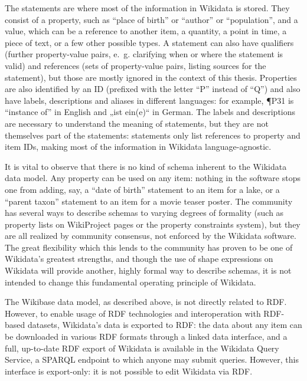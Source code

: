 The statements are where most of the information in Wikidata is stored.
They consist of a property, such as “place of birth” or “author” or “population”,
and a value, which can be a reference to another item, a quantity, a point in time, a piece of text,
or a few other possible types.
A statement can also have qualifiers
(further property-value pairs, e.~g. clarifying when or where the statement is valid)
and references (sets of property-value pairs, listing sources for the statement),
but those are mostly ignored in the context of this thesis.
Properties are also identified by an ID
(prefixed with the letter “P” instead of “Q”)
and also have labels, descriptions and aliases in different languages:
for example, \P{P31} is “instance of” in English and „\foreignlanguage{ngerman}{ist ein(e)}“ in German.
The labels and descriptions are necessary to understand the meaning of statements,
but they are not themselves part of the statements:
statements only list references to property and item IDs,
making most of the information in Wikidata language-agnostic.

It is vital to observe that there is no kind of schema inherent to the Wikidata data model.
Any property can be used on any item:
nothing in the software stops one from adding, say,
a “date of birth” statement to an item for a lake,
or a “parent taxon” statement to an item for a movie teaser poster.
The community has several ways to describe schemas to varying degrees of formality
(such as property lists on WikiProject pages or the property constraints system),
but they are all realized by community consensus,
not enforced by the Wikidata software.
The great flexibility which this lends to the community has proven to be one of Wikidata’s greatest strengths, %
and though the use of shape expressions %
on Wikidata will provide another,
highly formal way to describe schemas,
it is not intended to change this fundamental operating principle of Wikidata. %

The Wikibase data model, as described above,
is not directly related to RDF. %
However, to enable usage of RDF technologies and interoperation with RDF-based datasets,
Wikidata’s data is exported to RDF:
the data about any item can be downloaded in various RDF formats through a linked data interface, %
and a full, up-to-date RDF export of Wikidata is available in the Wikidata Query Service,
a SPARQL endpoint to which anyone may submit queries.
However, this interface is export-only:
it is not possible to edit Wikidata via RDF.



